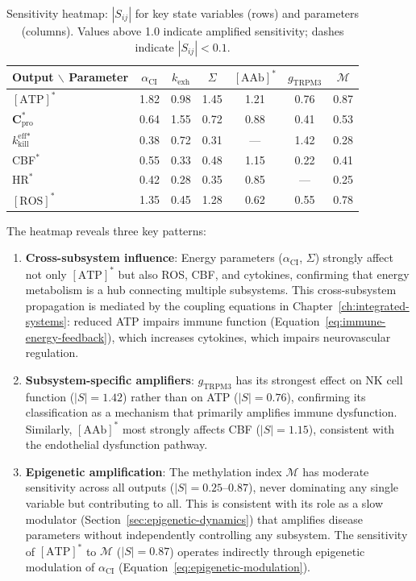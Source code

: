 \begin{table}[htbp]
\centering
\caption{Sensitivity heatmap: $|S_{ij}|$ for key state variables (rows) and parameters (columns). Values above 1.0 indicate amplified sensitivity; dashes indicate $|S_{ij}| < 0.1$.}
\label{tab:sensitivity-heatmap}
\begin{tabular}{l|cccccc}
\hline
Output $\backslash$ Parameter & $\alpha_{\text{CI}}$ & $k_{\text{exh}}$ & $\Sigma$ & $[\text{AAb}]^*$ & $g_{\text{TRPM3}}$ & $\mathcal{M}$ \\
\hline
$[\text{ATP}]^*$ & 1.82 & 0.98 & 1.45 & 1.21 & 0.76 & 0.87 \\
$\boldsymbol{C}_{\text{pro}}^*$ & 0.64 & 1.55 & 0.72 & 0.88 & 0.41 & 0.53 \\
$k_{\text{kill}}^{\text{eff}*}$ & 0.38 & 0.72 & 0.31 & --- & 1.42 & 0.28 \\
CBF$^*$ & 0.55 & 0.33 & 0.48 & 1.15 & 0.22 & 0.41 \\
$\text{HR}^*$ & 0.42 & 0.28 & 0.35 & 0.85 & --- & 0.25 \\
$[\text{ROS}]^*$ & 1.35 & 0.45 & 1.28 & 0.62 & 0.55 & 0.78 \\
\hline
\end{tabular}
\end{table}

The heatmap reveals three key patterns:
\begin{enumerate}
    \item \textbf{Cross-subsystem influence}: Energy parameters ($\alpha_{\text{CI}}$, $\Sigma$) strongly affect not only $[\text{ATP}]^*$ but also ROS, CBF, and cytokines, confirming that energy metabolism is a hub connecting multiple subsystems. This cross-subsystem propagation is mediated by the coupling equations in Chapter~\ref{ch:integrated-systems}: reduced ATP impairs immune function (Equation~\ref{eq:immune-energy-feedback}), which increases cytokines, which impairs neurovascular regulation.
    \item \textbf{Subsystem-specific amplifiers}: $g_{\text{TRPM3}}$ has its strongest effect on NK cell function ($|S| = 1.42$) rather than on ATP ($|S| = 0.76$), confirming its classification as a mechanism that primarily amplifies immune dysfunction. Similarly, $[\text{AAb}]^*$ most strongly affects CBF ($|S| = 1.15$), consistent with the endothelial dysfunction pathway.
    \item \textbf{Epigenetic amplification}: The methylation index $\mathcal{M}$ has moderate sensitivity across all outputs ($|S| = 0.25$--$0.87$), never dominating any single variable but contributing to all. This is consistent with its role as a slow modulator (Section~\ref{sec:epigenetic-dynamics}) that amplifies disease parameters without independently controlling any subsystem. The sensitivity of $[\text{ATP}]^*$ to $\mathcal{M}$ ($|S| = 0.87$) operates indirectly through epigenetic modulation of $\alpha_{\text{CI}}$ (Equation~\ref{eq:epigenetic-modulation}).
\end{enumerate}

